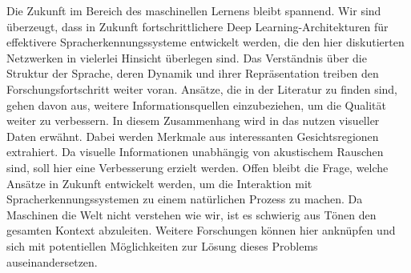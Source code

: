 Die Zukunft im Bereich des maschinellen Lernens bleibt spannend. Wir sind überzeugt, dass in Zukunft fortschrittlichere Deep Learning-Architekturen für effektivere Spracherkennungssysteme entwickelt werden, die den hier diskutierten Netzwerken in vielerlei Hinsicht überlegen sind. Das Verständnis über die Struktur der Sprache, deren Dynamik und ihrer Repräsentation treiben den Forschungsfortschritt weiter voran. Ansätze, die in der Literatur zu finden sind, gehen davon aus, weitere Informationsquellen einzubeziehen, um die Qualität weiter zu verbessern. In diesem Zusammenhang wird in {\cite{Yu.2014}} das nutzen visueller Daten erwähnt. Dabei werden Merkmale aus interessanten Gesichtsregionen extrahiert. Da visuelle Informationen unabhängig von akustischem Rauschen sind, soll hier eine Verbesserung erzielt werden. Offen bleibt die Frage, welche Ansätze in Zukunft entwickelt werden, um die Interaktion mit Spracherkennungssystemen zu einem natürlichen Prozess zu machen. Da Maschinen die Welt nicht verstehen wie wir, ist es schwierig aus Tönen den gesamten Kontext abzuleiten. Weitere Forschungen können hier anknüpfen und sich mit potentiellen Möglichkeiten zur Lösung dieses Problems auseinandersetzen.

\ifCLASSOPTIONcaptionsoff
  \newpage
\fi
